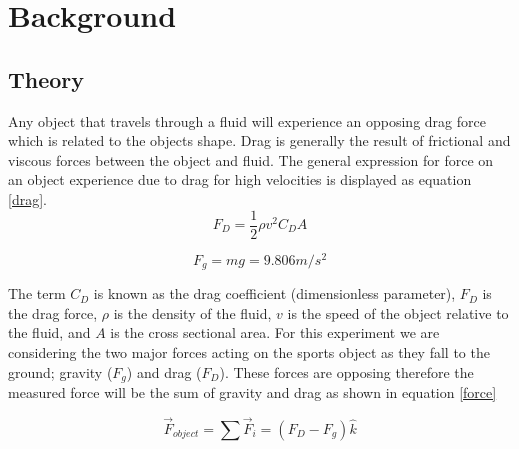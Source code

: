 \documentclass[paper=a4, fontsize=11pt, abstract=on]{scrartcl}
\numberwithin{equation}{section}		%
\numberwithin{figure}{section}			%
\numberwithin{table}{section}				%
\begin{document}
\section{Background}
\mbox{}%

 
 
\printnomenclature
\subsection{Theory}
Any object that travels through a fluid will experience an opposing drag force which is related to the objects shape. Drag is generally the result of frictional and viscous forces between the object and fluid. The general expression for force on an object experience due to drag for high velocities is displayed as equation \ref{drag}.
 \begin{equation}
\label{drag}
F_D= \frac{1}{2}\rho v^2C_DA
\end{equation}

\begin{equation}
\label{grav}
F_g= mg = 9.806 m/s^2
\end{equation}

The term $C_D$ is known as the drag coefficient (dimensionless parameter), $F_D$ is the drag force, $\rho$ is the density of the fluid, $v$ is the speed of the object relative to the fluid, and $A$ is the cross sectional area. For this experiment we are considering the two major forces acting on the sports object as they fall to the ground; gravity ($F_g$) and drag ($F_D$). These forces are opposing therefore the measured force will be the sum of gravity and drag as shown in equation \ref{force}

\begin{equation}
\label{force}
\vec{F}_{object}= \sum{}{}\vec{F}_i = (F_D-F_g) \hat{k}
\end{equation}
\end{document}
